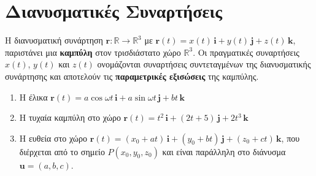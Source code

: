 


\geometry{left=15.63mm,right=15.63mm,top=30.25mm, bottom=36.25mm,footskip=24.16mm,
  headsep=24.16mm}

\pagestyle{vangelis}
\everymath{\displaystyle}




\chapter*{Διανυσματικές Συναρτήσεις}

\begin{dfn} Η διανυσματική συνάρτηση
  $ \mathbf{r} \colon \mathbb{R} \to \mathbb{R}^{3} $ με 
  $ \mathbf{r}(t) = x(t) \, \mathbf{i}+y(t) \, \mathbf{j}+z(t) \, \mathbf{k} $, 
  παριστάνει μια \textbf{καμπύλη} στον τρισδιάστατο χώρο $ \mathbb{R}^{3} $. 
  Οι πραγματικές συναρτήσεις $ x(t) $, $ y(t) $ και $ z(t) $ ονομάζονται
  \textcolor{Col1}{συναρτήσεις συντεταγμένων} της διανυσματικής συνάρτησης και αποτελούν 
  τις \textbf{παραμετρικές εξισώσεις} της καμπύλης.
\end{dfn}

\begin{examples}
\item {}
  \begin{enumerate}
    \item Η έλικα $ \mathbf{r}(t)= a \cos{\omega t}\, \mathbf{i} + a \sin{\omega t}\,
      \mathbf{j} + bt \, \mathbf{k} $ 
    \item Η τυχαία καμπύλη στο χώρο 
      $ \mathbf{r}(t)=t^{2}\, \mathbf{i} + (2t+5)\, \mathbf{j} + 2t^{3} \, \mathbf{k}$ 
    \item Η ευθεία στο χώρο $ \mathbf{r}(t)=(x_{0}+at)\, \mathbf{i} + (y_{0}+bt)\,
      \mathbf{j} + (z_{0}+ct) \, \mathbf{k}$, που διέρχεται από το σημείο 
      $ P(x_{0}, y_{0}, z_{0}) $ και είναι παράλληλη στο διάνυσμα 
      $ \mathbf{u} = (a,b,c) $.
  \end{enumerate}
\end{examples}





